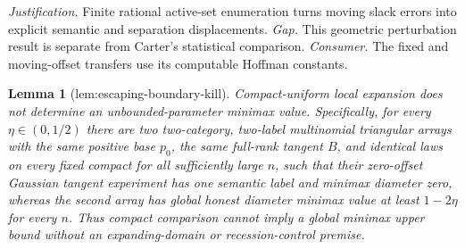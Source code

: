 \documentclass{article}
\newtheorem{lemma}{Lemma}
\begin{document}
\par\smallskip\noindent \textit{Justification.} Finite rational active-set enumeration turns moving slack errors into explicit semantic and separation displacements. \textit{Gap.} This geometric perturbation result is separate from Carter's statistical comparison. \textit{Consumer.} The fixed and moving-offset transfers use its computable Hoffman constants.

\begin{lemma}[lem:escaping-boundary-kill]\label{lem:escaping-boundary-kill}
Compact-uniform local expansion does not determine an unbounded-parameter minimax value. Specifically, for every \(\eta\in(0,1/2)\) there are two two-category, two-label multinomial triangular arrays with the same positive base \(p_0\), the same full-rank tangent \(B\), and identical laws on every fixed compact for all sufficiently large \(n\), such that their zero-offset Gaussian tangent experiment has one semantic label and minimax diameter zero, whereas the second array has global honest diameter minimax value at least \(1-2\eta\) for every \(n\). Thus compact comparison cannot imply a global minimax upper bound without an expanding-domain or recession-control premise.
\end{lemma}
\end{document}
